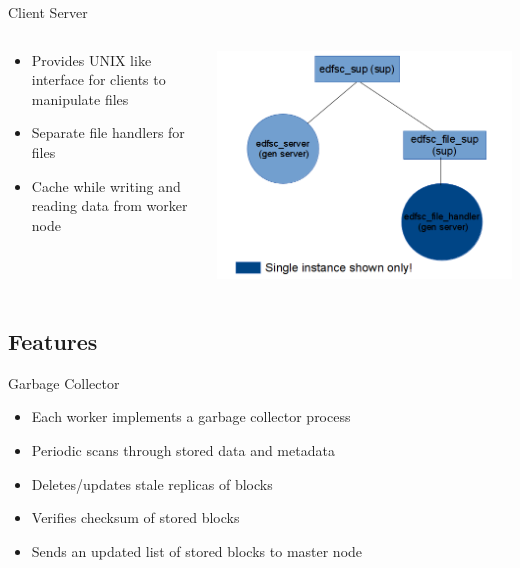 \documentclass{beamer}
\begin{document}
\begin{frame}{Client Server}
\begin{columns}
    \begin{column}{0.5\textwidth}
        \begin{itemize}
        \item Provides UNIX like interface for clients to manipulate files
        \item Separate file handlers for files
        \item Cache while writing and reading data from worker node
        \end{itemize}
    \end{column}
    \begin{column}{0.5\textwidth}
        \includegraphics[scale=0.3]{images/client_otp_layout}
    \end{column}
\end{columns}
\end{frame}

\subsection{Features}
\begin{frame}{Garbage Collector}
\begin{itemize}
\item Each worker implements a garbage collector process
\item Periodic scans through stored data and metadata
\item Deletes/updates stale replicas of blocks
\item Verifies checksum of stored blocks
\item Sends an updated list of stored blocks to master node
\end{itemize}
\end{frame}
\end{document}
